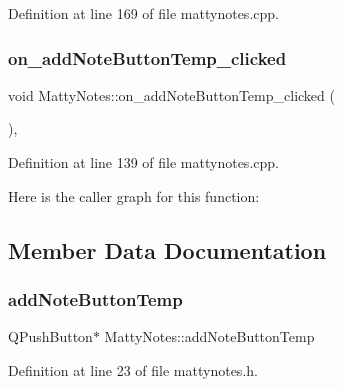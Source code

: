 Definition at line 169 of file mattynotes.\+cpp.

\hypertarget{classMattyNotes_a03ee529c5492bc8d73a8a93ecc32c394}{}\label{classMattyNotes_a03ee529c5492bc8d73a8a93ecc32c394} 
\subsubsection{\texorpdfstring{on\+\_\+add\+Note\+Button\+Temp\+\_\+clicked}{on\_addNoteButtonTemp\_clicked}}
{\footnotesize\ttfamily void Matty\+Notes\+::on\+\_\+add\+Note\+Button\+Temp\+\_\+clicked (\begin{DoxyParamCaption}{ }\end{DoxyParamCaption})\hspace{0.3cm}{\ttfamily [private]}, {\ttfamily [slot]}}



Definition at line 139 of file mattynotes.\+cpp.

Here is the caller graph for this function\+:


\subsection{Member Data Documentation}
\hypertarget{classMattyNotes_a319952a9839f335ab9856b83369ea454}{}\label{classMattyNotes_a319952a9839f335ab9856b83369ea454} 
\subsubsection{\texorpdfstring{add\+Note\+Button\+Temp}{addNoteButtonTemp}}
{\footnotesize\ttfamily Q\+Push\+Button$\ast$ Matty\+Notes\+::add\+Note\+Button\+Temp}



Definition at line 23 of file mattynotes.\+h.

\hypertarget{classMattyNotes_ac72ba30ddc403561ed6904c4678caaaf}{}\label{classMattyNotes_ac72ba30ddc403561ed6904c4678caaaf} 

